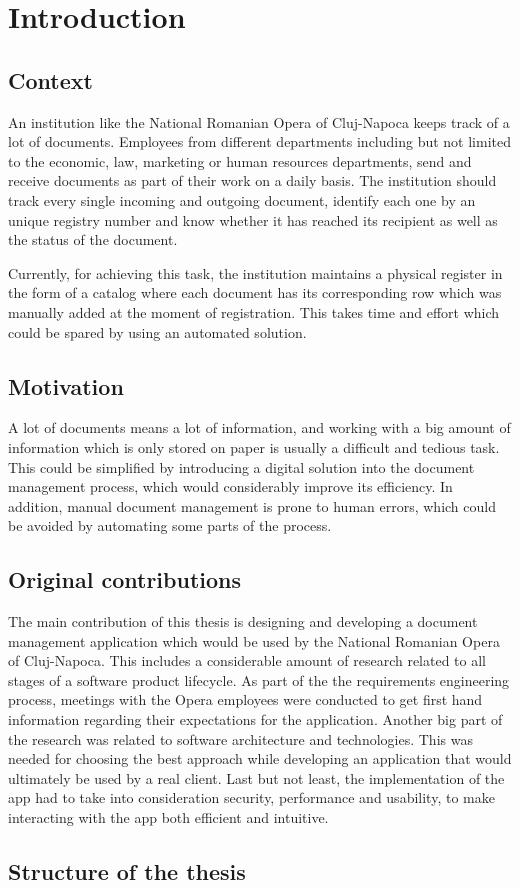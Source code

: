 \chapter{Introduction}
\label{chapter:introduction}

\section{Context}
\label{section:context}

An institution like the National Romanian Opera of Cluj-Napoca keeps track of a lot of documents.
Employees from different departments including but not limited to the economic, law, marketing or human resources departments, send and receive documents as part of their work on a daily basis. The institution should track every single incoming and outgoing document, identify each one by an unique registry number and know whether it has reached its recipient as well as the status of the document.

Currently, for achieving this task, the institution maintains a physical register in the form of a catalog where each document has its corresponding row which was manually added at the moment of registration. This takes time and effort which could be spared by using an automated solution.

\section{Motivation}
\label{section:motivation}

A lot of documents means a lot of information, and working with a big amount of information which is only stored on paper is usually a difficult and tedious task. This could be simplified by introducing a digital solution into the document management process, which would considerably improve its efficiency. In addition, manual document management is prone to human errors, which could be avoided by automating some parts of the process.



\section{Original contributions}
\label{section:originalContributions}

The main contribution of this thesis is designing and developing a document management application which would be used by the National Romanian Opera of Cluj-Napoca. This includes a considerable amount of research related to all stages of a software product lifecycle. As part of the the requirements engineering process, meetings with the Opera employees were conducted to get first hand information regarding their expectations for the application. Another big part of the research was related to software architecture and technologies. This was needed for choosing the best approach while developing an application that would ultimately be used by a real client. Last but not least, the implementation of the app had to take into consideration security, performance and usability, to make interacting with the app both efficient and intuitive.

\section{Structure of the thesis}
\label{section:structureOfTheThesis}


